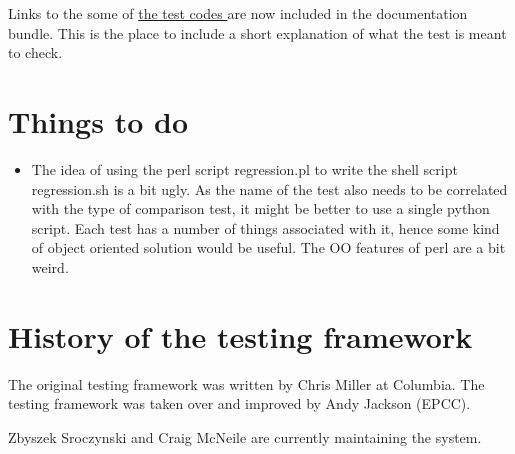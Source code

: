 \documentclass[12pt]{article}
\begin{document}
Links to the some of 
\href{../examples}{the test codes }
are now
included in the documentation bundle.
This is the place to include a short explanation of 
what the test is meant to check.

\section{Things to do} 

\begin{itemize}


\item The idea of using the perl script regression.pl to write
      the shell script regression.sh is a bit ugly.
      As the name of the test also needs to be correlated with the 
      type of comparison test, it might be better to use a single
      python script. Each test has a number of things 
      associated with it, hence some kind of object oriented 
      solution would be useful. The OO features of perl are
      a bit weird.

\end{itemize}


\section{History of the testing framework} \label{se:history}

The original testing framework was written by Chris Miller
at Columbia. The testing framework was taken over and improved
by Andy Jackson (EPCC). 

Zbyszek Sroczynski and Craig McNeile are currently maintaining
the system.
\end{document}

